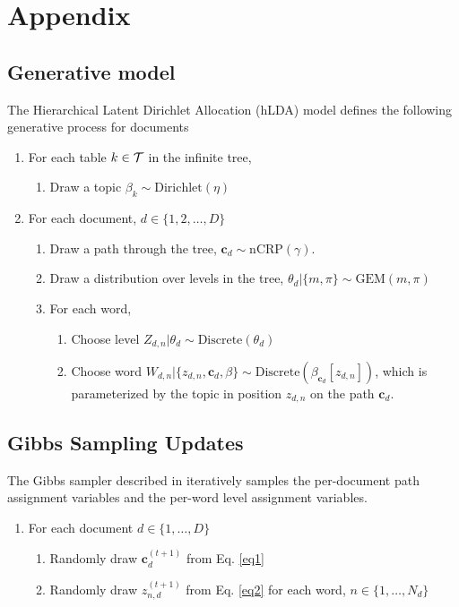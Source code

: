 \documentclass{article}
\begin{document}



\newpage
\section*{Appendix}

\subsection*{Generative model}
The Hierarchical Latent Dirichlet Allocation (hLDA) model defines the following generative process for documents
\begin{enumerate}
  \item For each table $ k \in \cal{T}$ in the infinite tree,
  \begin{enumerate}
    \item Draw a topic $\beta_k \sim \text{Dirichlet}(\eta)$
  \end{enumerate}
  \item For each document, $d \in \{1, 2, \dots , D\}$
    \begin{enumerate}
      \item Draw a path through the tree, $\mathbf{c}_d \sim \text{nCRP}(\gamma)$.
      \item Draw a distribution over levels in the tree, $\theta_d | \{m, \pi\} \sim \text{GEM}(m, \pi)$
      \item For each word,
        \begin{enumerate}
          \item Choose level $Z_{d,n} | \theta_d \sim \text{Discrete}(\theta_d)$
          \item Choose word $W_{d,n} | \{ z_{d,n}, \mathbf{c}_d, \beta \} \sim \text{Discrete}(\beta_{\mathbf{c}_d}[z_{d,n}])$, which is parameterized by the topic in position $z_{d,n}$ on the path $\mathbf{c}_d$.
        \end{enumerate}
    \end{enumerate}
\end{enumerate}

\subsection*{Gibbs Sampling Updates}
The Gibbs sampler described in \citet{Blei2010} iteratively samples the per-document path assignment variables and the per-word level assignment variables. 
\begin{enumerate}
  \item For each document $d \in \{ 1, \dots , D\}$
  \begin{enumerate}
    \item Randomly draw $\mathbf{c}_d^{(t+1)}$ from Eq. \ref{eq1}
    \item Randomly draw $z_{n,d}^{(t+1)}$ from Eq. \ref{eq2} for each word, $n \in \{1, \dots , N_d\}$
  \end{enumerate}
\end{enumerate}
\end{document}
